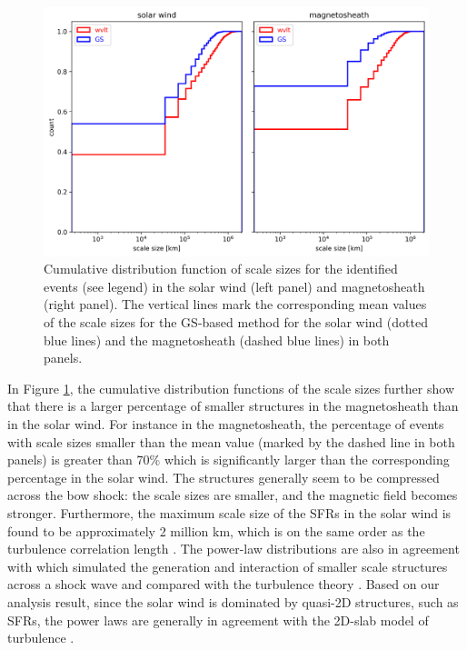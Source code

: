 \begin{figure}
    \centering
    \includegraphics[width=\textwidth]{Figures/Histograms/cdf_scalesize.png}
    \caption[Cumulative distribution function of scale sizes for the identified events]{Cumulative distribution function of scale sizes for the identified events (see legend) in the solar wind (left panel) and magnetosheath (right panel). The vertical lines mark the corresponding mean values of the scale sizes for the GS-based method for the solar wind (dotted blue lines) and the magnetosheath (dashed blue lines) in both panels.}
    \label{fig:cdf-scalesize}
\end{figure}

In Figure \ref{fig:cdf-scalesize}, the cumulative distribution functions of the scale sizes further show that there is a larger percentage of smaller structures in the magnetosheath than in the solar wind. For instance in the magnetosheath, the percentage of events with scale sizes smaller than the mean value (marked by the dashed line in both panels) is greater than 70\% which is significantly larger than the corresponding percentage in the solar wind. The structures generally seem to be compressed across the bow shock: the scale sizes are smaller, and the magnetic field becomes stronger. Furthermore, the maximum scale size of the SFRs in the solar wind is found to be approximately 2 million km, which is on the same order as the turbulence correlation length \citep{Horbury:1996}. The power-law distributions are also in agreement with \citep{Nakanotani:2022, Nakanotani2:2022} which simulated the generation and interaction of smaller scale structures across a shock wave and compared with the turbulence theory \citep{Zank:2021, Zank:2017}. Based on our analysis result, since the solar wind is dominated by quasi-2D structures, such as SFRs, the power laws are generally in agreement with the 2D-slab model of turbulence \citep{Zank:2021, Zank:2017}.